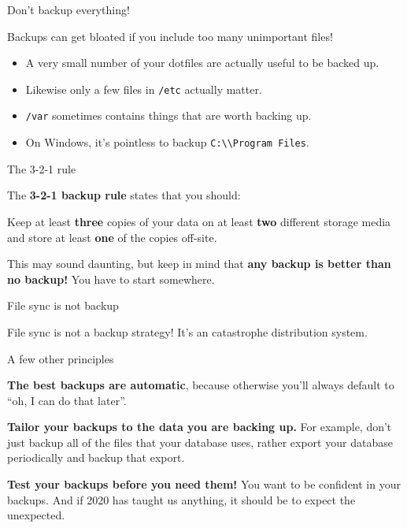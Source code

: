 \documentclass{lug}
\begin{document}
\begin{frame}{Don't backup everything!}

    Backups can get bloated if you include too many unimportant files!
    \pause

    \begin{itemize}[<+->]
        \item A very small number of your dotfiles are actually useful to be
            backed up.
        \item Likewise only a few files in \texttt{/etc} actually matter.
        \item \texttt{/var} sometimes contains things that are worth backing up.
        \item On Windows, it's pointless to backup
            \texttt{C:\textbackslash\textbackslash Program Files}.
    \end{itemize}

\end{frame}

\begin{frame}{The 3-2-1 rule}

    The \textbf{3-2-1 backup rule} states that you should: \pause

    Keep at least \textbf{three} copies of your data \pause on at least
    \textbf{two} different storage media \pause and store at least \textbf{one}
    of the copies off-site.

    \pause This may sound daunting, but keep in mind that \textbf{any backup is
    better than no backup!} You have to start somewhere.

\end{frame}

\begin{frame}{File sync is not backup}

    File sync is not a backup strategy! \pause It's an catastrophe distribution
    system.

\end{frame}

\begin{frame}{A few other principles}

    \textbf{The best backups are automatic}, because otherwise you'll always
    default to ``oh, I can do that later''.

    \pause
    \textbf{Tailor your backups to the data you are backing up.} For example,
    don't just backup all of the files that your database uses, rather export
    your database periodically and backup that export.

    \pause
    \textbf{Test your backups before you need them!} You want to be confident in
    your backups. And if 2020 has taught us anything, it should be to expect the
    unexpected.

\end{frame}
\end{document}
